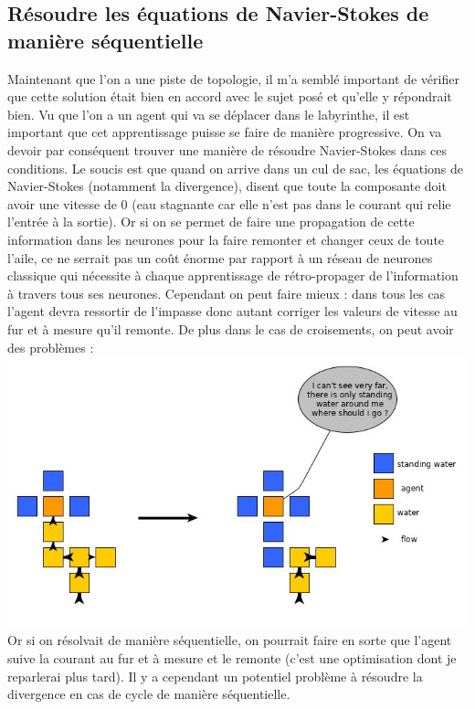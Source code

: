 \documentclass[10pt]{article}
\begin{document}
\subsection{Résoudre les équations de Navier-Stokes de manière séquentielle}
Maintenant que l'on a une piste de topologie, il m'a semblé important de vérifier que cette solution était bien en accord avec le sujet posé et qu'elle y répondrait bien. Vu que l'on a un agent qui va se déplacer dans le labyrinthe, il est important que cet apprentissage puisse se faire de manière progressive. On va devoir par conséquent trouver une manière de résoudre Navier-Stokes dans ces conditions. Le soucis est que quand on arrive dans un cul de sac, les équations de Navier-Stokes (notamment la divergence), disent que toute la composante doit avoir une vitesse de 0 (eau stagnante car elle n'est pas dans le courant qui relie l'entrée à la sortie). Or si on se permet de faire une propagation de cette information dans les neurones pour la faire remonter et changer ceux de toute l'aile, ce ne serrait pas un coût énorme par rapport à un réseau de neurones classique qui nécessite à chaque apprentissage de rétro-propager de l'information à travers tous ses neurones. Cependant on peut faire mieux : dans tous les cas l'agent devra ressortir de l'impasse donc autant corriger les valeurs de vitesse au fur et à mesure qu'il remonte. De plus dans le cas de croisements, on peut avoir des problèmes :
\indent\indent\indent\indent\indent\includegraphics[scale=0.45]{question.jpg}\\
Or si on résolvait de manière séquentielle, on pourrait faire en sorte que l'agent suive la courant au fur et à mesure et le remonte (c'est une optimisation dont je reparlerai plus tard). Il y a cependant un potentiel problème à résoudre la divergence en cas de cycle de manière séquentielle. \\ 
\end{document}
